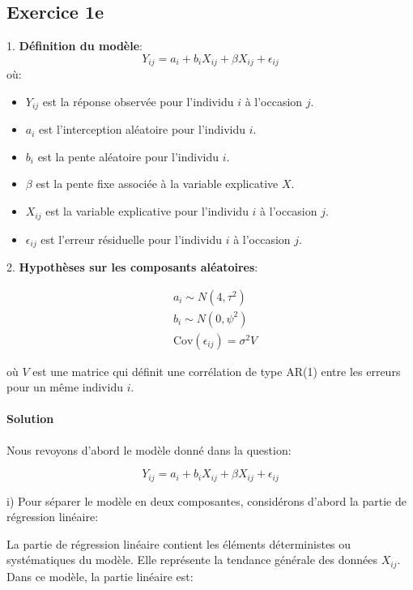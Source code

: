 \documentclass[../main.tex]{subfiles}
\begin{document}
\begin{CJK*}{UTF8}{gbsn}
\section*{Exercice 1e}

1. \textbf{Définition du modèle}:
\[ Y_{ij} = a_i + b_i X_{ij} + \beta X_{ij} + \epsilon_{ij} \]
où:
\begin{itemize}
    \item \( Y_{ij} \) est la réponse observée pour l'individu \( i \) à l'occasion \( j \).
    \item \( a_i \) est l'interception aléatoire pour l'individu \( i \).
    \item \( b_i \) est la pente aléatoire pour l'individu \( i \).
    \item \( \beta \) est la pente fixe associée à la variable explicative \( X \).
    \item \( X_{ij} \) est la variable explicative pour l'individu \( i \) à l'occasion \( j \).
    \item \( \epsilon_{ij} \) est l'erreur résiduelle pour l'individu \( i \) à l'occasion \( j \).
\end{itemize}

2. \textbf{Hypothèses sur les composants aléatoires}:

\begin{equation*}
    \begin{split}
        & a_i \sim N(4, \tau^2) 
        \\ & b_i \sim N(0, \psi^2)
        \\ & \text{Cov}(\epsilon_{ij}) = \sigma^2 V
    \end{split}
\end{equation*}

où \( V \) est une matrice qui définit une corrélation de type AR(1) entre les erreurs pour un même individu \( i \).

\paragraph{Solution} 
Nous revoyons d'abord le modèle donné dans la question:

\[
Y_{ij} = a_i + b_i X_{ij} + \beta X_{ij} + \epsilon_{ij}
\]

i) Pour séparer le modèle en deux composantes, considérons d'abord la partie de régression linéaire:

La partie de régression linéaire contient les éléments déterministes ou systématiques du modèle. Elle représente la tendance générale des données \(X_{ij}\). Dans ce modèle, la partie linéaire est:


\end{CJK*}
\end{document}
